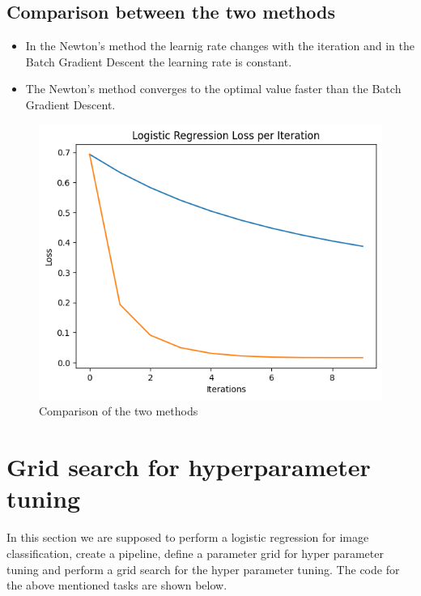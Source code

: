 \documentclass[11pt,a4paper]{article}
\begin{document}
\subsection{Comparison between the two methods}

\begin{itemize}
    \item In the Newton's method the learnig rate changes with the iteration and in the Batch Gradient Descent the learning rate is constant.
    \item The Newton's method converges to the optimal value faster than the Batch Gradient Descent.
\end{itemize}

{\begin{figure}[h]
    \centering
    \includegraphics[width=1.0\linewidth]{images/3.png}
    \caption{Comparison of the two methods}
\end{figure}}

\newpage

\section {Grid search for hyperparameter tuning}
In this section we are supposed to perform a logistic regression for image classification, create a pipeline, define a parameter grid for hyper parameter tuning and perform a grid search for the hyper parameter tuning. The code for the above mentioned tasks are shown below.

\lstset{style=mystyle}

\end{document}
